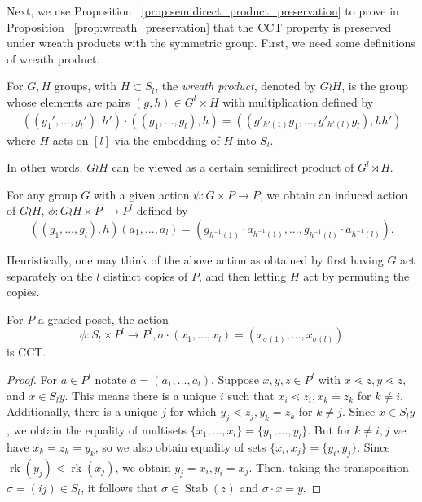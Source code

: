 \documentclass[smallextended, envcountsame, numbook]{svjour3}
\numberwithin{equation}{section}
\newcommand\rk{\operatorname{rk}}
\newcommand\Stab{\operatorname{Stab}}
\begin{document}
Next, we use Proposition ~\ref{prop:semidirect_product_preservation} to prove in Proposition ~\ref{prop:wreath_preservation} that the CCT property is preserved under wreath products with the symmetric group. First, we need some definitions of wreath product.

\begin{definition}
For $G, H$ groups, with $H \subset S_l$, the {\it wreath product}, denoted by $G \wr H$, is the group whose elements are pairs $(g,h) \in G^l\times H$ with multiplication defined by
\begin{align*}
((g_1',\ldots, g_l'),h') \cdot ((g_1,\ldots, g_l) ,h) =((g'_{h'(1)}g_1,\ldots, g'_{h'(l)}g_l),hh')
\end{align*}
where $H$ acts on $[l]$ via the embedding of $H$ into $S_l$.
\end{definition}

In other words, $G\wr H$ can be viewed as a certain semidirect product of $G^l \rtimes H$.

\begin{definition}
\label{defn:wreath_action}
For any group $G$ with a given action $\psi\colon G\times P \rightarrow P$, we obtain an induced action of $G \wr H$, $\phi\colon G \wr H \times P^l \rightarrow P^l$ defined by 
$$((g_1,\ldots, g_l),h)(a_1,\ldots, a_l) = (g_{h^{-1}(1)}\cdot a_{h^{-1}(1)},\ldots,g_{h^{-1}(l)} \cdot a_{h^{-1}(l)}).$$
\end{definition}

\begin{remark}
Heuristically, one may think of the above action as obtained by first having $G$ act separately on the $l$ distinct copies of $P$, and then letting $H$ act by permuting the copies.
\end{remark}

\begin{lemma}
\label{lem:symmetric_group_product_action}
For $P$ a graded poset, the action 
$$\phi\colon S_l \times P^l \rightarrow P^l,\sigma \cdot(x_1,\ldots, x_l) = (x_{\sigma(1)},\ldots, x_{\sigma(l)})$$
is CCT.
\end{lemma}
\begin{proof}
For $a \in P^l$ notate $a = (a_1,\ldots, a_l)$. Suppose $x,y,z \in P^l$ with $x\lessdot z,y\lessdot z$, and $x \in S_ly$. This means there is a unique $i$ such that $x_i \lessdot z_i,x_k = z_k$ for $k \neq i$. Additionally, there is a unique $j$ for which $y_j \lessdot z_j,y_k =z_k$ for $k \neq j$. Since $x \in S_ly$, we obtain the equality of multisets $\{x_1,\ldots, x_l\}=\{y_1,\ldots,y_l\}$. But for $k \neq i,j$ we have $x_k = z_k = y_k$, so we also obtain equality of sets $\{x_i,x_j\} = \{y_i,y_j\}$. Since $\rk(y_j) \lessdot \rk(x_j)$, we obtain $y_j = x_i,y_i = x_j$. Then, taking the transposition $\sigma  = (ij) \in S_l$, it follows that $\sigma \in \Stab(z)$ and $\sigma \cdot x = y$.
\end{proof}
\end{document}
